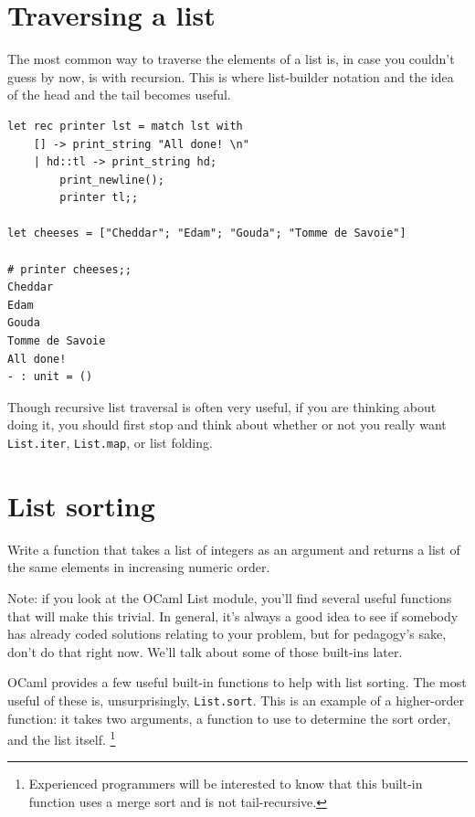 \documentclass[10pt]{book}
\begin{document}
{\section{Traversing a list}
The most common way to traverse the elements of a list is, 
in case you couldn't guess by now, is with recursion.  This 
is where list-builder notation and the idea of the head and 
the tail becomes useful.

\beforeverb
\begin{verbatim}
let rec printer lst = match lst with
	[] -> print_string "All done! \n"
	| hd::tl -> print_string hd;
		print_newline();
		printer tl;;

let cheeses = ["Cheddar"; "Edam"; "Gouda"; "Tomme de Savoie"]

# printer cheeses;;
Cheddar
Edam
Gouda
Tomme de Savoie
All done!
- : unit = ()

\end{verbatim}
\afterverb
%

Though recursive list traversal is often very useful, if you
are thinking about doing it, you should first stop and think 
about whether or not you really want {\tt List.iter}, {\tt List.map},
or list folding.


\section{List sorting}

\begin{ex}
Write a function that takes a list of integers as an argument 
and returns a list of the same elements in increasing numeric 
order.

Note: if you look at the OCaml List module, you'll find several
useful functions that will make this trivial. In general, it's 
always a good idea to see if somebody has already coded solutions 
relating to your problem, but for pedagogy's sake, don't do that 
right now. We'll talk about some of those built-ins later.
\end{ex}

OCaml provides a few useful built-in functions to help with list 
sorting. The most useful of these is, unsurprisingly, {\tt List.sort}.
This is an example of a higher-order function: it takes two arguments, 
a function to use to determine the sort order, and the list itself.
\footnote{Experienced programmers will be interested to know that this 
built-in function uses a merge sort and is not tail-recursive.}

}
\end{document}
